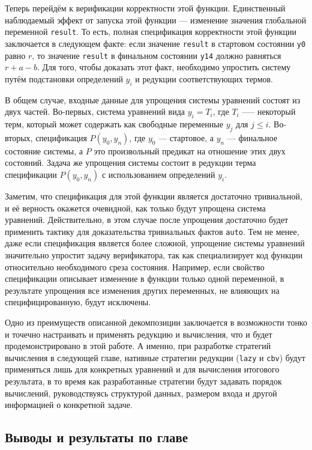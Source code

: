 \documentclass[../diploma.tex]{subfiles}
\begin{document}
Теперь перейдём к верификации корректности этой функции. Единственный наблюдаемый эффект от запуска этой функции --- изменение значения глобальной переменной \texttt{result}. То есть, полная спецификация корректности этой функции заключается в следующем факте: если значение \texttt{result} в стартовом состоянии \texttt{y0} равно $r$, то значение \texttt{result} в финальном состоянии \texttt{y14} должно равняться $r + a - b$. Для того, чтобы доказать этот факт, необходимо упростить систему путём подстановки определений $y_i$ и редукции соответствующих термов.

В общем случае, входные данные для упрощения системы уравнений состоят из двух частей. Во-первых, система уравнений вида $y_i = T_i$, где $T_i$ —-- некоторый терм, который может содержать как свободные переменные $y_j$ для $j \le i$. Во-вторых, спецификация $P(y_0, y_n)$, где $y_0$ --- стартовое, а $y_n$ --- финальное состояние системы, а $P$ это произвольный предикат на отношение этих двух состояний. Задача же упрощения системы состоит в редукции терма спецификации $P(y_0, y_n)$ с использованием определений $y_i$.

Заметим, что спецификация для этой функции является достаточно тривиальной, и её верность окажется очевидной, как только будут упрощена система уравнений. Действительно, в этом случае после упрощения достаточно будет применить тактику для доказательства тривиальных фактов \texttt{auto}. Тем не менее, даже если спецификация является более сложной, упрощение системы уравнений значительно упростит задачу верификатора, так как специализирует код функции относительно необходимого среза состояния. Например, если свойство спецификации описывает изменение в функции только одной переменной, в результате упрощения все изменения других переменных, не влияющих на специфицированную, будут исключены.

Одно из преимуществ описанной декомпозиции заключается в возможности тонко и точечно настраивать и применять редукцию и вычисления, что и будет продемонстрировано в этой работе. А именно, при разработке стратегий вычисления в следующей главе, нативные стратегии редукции (\texttt{lazy} и \texttt{cbv}) будут применяться лишь для конкретных уравнений и для вычисления итогового результата, в то время как разработанные стратегии будут задавать порядок вычислений, руководствуясь структурой данных, размером входа и другой информацией о конкретной задаче.

\subsection{Выводы и результаты по главе}
\end{document}
